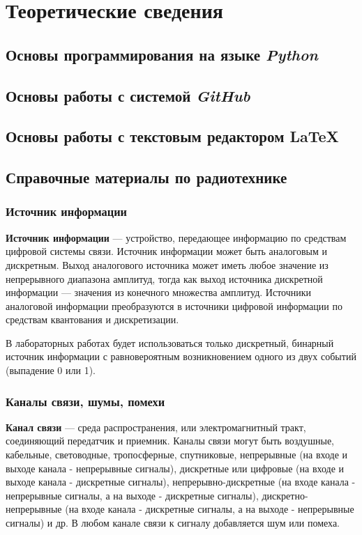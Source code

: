\chapter{Теоретические сведения}

\section{Основы программирования на языке \textit{Python}}

\section{Основы работы с системой \textit{GitHub}}

\section{Основы работы с текстовым редактором \LaTeX{}}

\section{Справочные материалы по радиотехнике}

\subsection{Источник информации}

\textbf{Источник информации} --- устройство, передающее информацию по средствам цифровой системы связи. Источник информации может быть аналоговым и дискретным. Выход аналогового источника может иметь любое значение из непрерывного диапазона амплитуд, тогда как выход источника дискретной информации --- значения из конечного множества амплитуд. Источники аналоговой информации преобразуются в источники цифровой информации по средствам квантования и дискретизации.

В лабораторных работах будет использоваться только дискретный, бинарный источник информации с равновероятным возникновением одного из двух событий (выпадение 0 или 1).

\subsection{Каналы связи, шумы, помехи}

\textbf{Канал связи} --- среда распространения, или электромагнитный тракт, соединяющий передатчик и приемник. Каналы связи могут быть воздушные, кабельные, световодные, тропосферные, спутниковые, непрерывные (на входе и выходе канала - непрерывные сигналы), дискретные или цифровые (на входе и выходе канала - дискретные сигналы), непрерывно-дискретные (на входе канала - непрерывные сигналы, а на выходе - дискретные сигналы), дискретно-непрерывные (на входе канала - дискретные сигналы, а на выходе - непрерывные сигналы) и др. В любом канале связи к сигналу добавляется шум или помеха.

